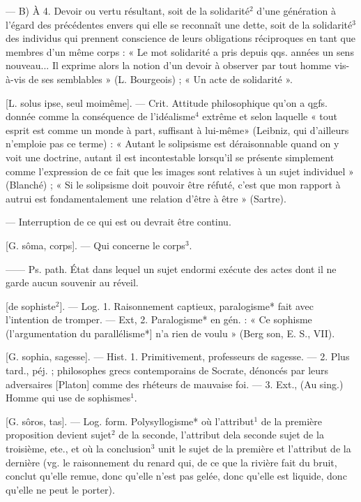 \begin{itemize}[leftmargin=1cm, label=, itemsep=1pt]
— B) À 4. Devoir ou vertu résultant, soit de la solidarité$^2$ d’une
génération à l'égard des précédentes
envers qui elle se reconnaît une
dette, soit de la solidarité$^3$ des individus qui prennent conscience de
leurs obligations réciproques en tant
que membres d’un même corps :
« Le mot solidarité a pris depuis
qqs. années un sens nouveau... Il
exprime alors la notion d’un devoir
à observer par tout homme vis-à-vis
de ses semblables » (L. Bourgeois) ;
« Un acte de solidarité ».

 [L. solus ipse, seul moimême]. — Crit. Attitude philosophique qu'on a qgfs. donnée
comme la conséquence de l'idéalisme$^4$ extrême et selon laquelle
« tout esprit est comme un monde à
part, suffisant à lui-même» (Leibniz,
qui d’ailleurs n’emploie pas ce
terme) : « Autant le solipsisme est
déraisonnable quand on y voit une
doctrine, autant il est incontestable lorsqu'il se présente simplement comme l'expression de ce fait
que les images sont relatives à un
sujet individuel » (Blanché) ; « Si le
solipsisme doit pouvoir être réfuté,
c'est que mon rapport à autrui est
fondamentalement une relation
d’être à être » (Sartre).

 — Interruption
de ce qui est ou devrait être continu.

 [G. sôma, corps]. — Qui
concerne le corps$^3$.

 —— Ps. path. État
dans lequel un sujet endormi exécute
des actes dont il ne garde aucun souvenir au réveil.

 [de sophiste$^2$]. — Log. 1. Raisonnement captieux, paralogisme*
fait avec l'intention de tromper. —
Ext, 2. Paralogisme* en gén. : « Ce
sophisme (l'argumentation du parallélisme*] n’a rien de voulu » (Berg
son, E. S., VII).

 [G. sophia, sagesse]. — Hist.
1. Primitivement, professeurs de
sagesse. — 2. Plus tard., péj. ; philosophes grecs contemporains de
Socrate, dénoncés par leurs adversaires [Platon] comme des rhéteurs
de mauvaise foi. — 3. Ext., (Au
sing.) Homme qui use de sophismes$^1$.

 [G. sôros, tas]. — Log. form.
Polysyllogisme* où l’attribut$^1$ de la
première proposition devient sujet$^2$
de la seconde, l’attribut dela seconde
sujet de la troisième, ete., et où la
conclusion$^3$ unit le sujet de la première et l’attribut de la dernière (vg.
le raisonnement du renard qui, de
ce que la rivière fait du bruit, conclut qu’elle remue, donc qu’elle n’est
pas gelée, donc qu’elle est liquide,
donc qu'elle ne peut le porter).


\end{itemize}
